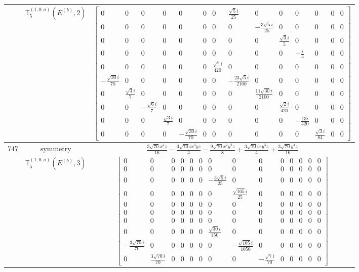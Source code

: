 \documentclass[fleqn,8pt,landscape]{jsarticle}
\begin{document}
\begin{longtable}{ccc}
$  $ & $ \mathbb{T}_{5}^{(1,0;a)}(E^{(b)},2) $ & $ \begin{bmatrix} 0 & 0 & 0 & 0 & 0 & 0 & 0 & \frac{\sqrt{5} i}{25} & 0 & 0 & 0 & 0 & 0 & 0 \\ 0 & 0 & 0 & 0 & 0 & 0 & 0 & 0 & - \frac{3 \sqrt{5} i}{25} & 0 & 0 & 0 & 0 & 0 \\ 0 & 0 & 0 & 0 & 0 & 0 & 0 & 0 & 0 & \frac{\sqrt{3} i}{5} & 0 & 0 & 0 & 0 \\ 0 & 0 & 0 & 0 & 0 & 0 & 0 & 0 & 0 & 0 & - \frac{i}{5} & 0 & 0 & 0 \\ 0 & 0 & 0 & 0 & 0 & 0 & \frac{\sqrt{7} i}{420} & 0 & 0 & 0 & 0 & 0 & 0 & 0 \\ - \frac{\sqrt{30} i}{70} & 0 & 0 & 0 & 0 & 0 & 0 & - \frac{23 \sqrt{5} i}{2100} & 0 & 0 & 0 & 0 & 0 & 0 \\ 0 & \frac{\sqrt{3} i}{7} & 0 & 0 & 0 & 0 & 0 & 0 & \frac{11 \sqrt{30} i}{2100} & 0 & 0 & 0 & 0 & 0 \\ 0 & 0 & - \frac{\sqrt{6} i}{7} & 0 & 0 & 0 & 0 & 0 & 0 & \frac{\sqrt{2} i}{420} & 0 & 0 & 0 & 0 \\ 0 & 0 & 0 & \frac{\sqrt{3} i}{7} & 0 & 0 & 0 & 0 & 0 & 0 & - \frac{13 i}{420} & 0 & 0 & 0 \\ 0 & 0 & 0 & 0 & - \frac{\sqrt{30} i}{70} & 0 & 0 & 0 & 0 & 0 & 0 & \frac{\sqrt{3} i}{84} & 0 & 0 \end{bmatrix} $ \\ \hline
$ 747 $ & $ \text{symmetry} $ & $ \frac{3 \sqrt{70} x^{4} z}{16} - \frac{3 \sqrt{70} i x^{3} y z}{4} - \frac{9 \sqrt{70} x^{2} y^{2} z}{8} + \frac{3 \sqrt{70} i x y^{3} z}{4} + \frac{3 \sqrt{70} y^{4} z}{16} $ \\
$  $ & $ \mathbb{T}_{5}^{(1,0;a)}(E^{(b)},3) $ & $ \begin{bmatrix} 0 & 0 & 0 & 0 & 0 & 0 & 0 & 0 & 0 & 0 & 0 & 0 & 0 & 0 \\ 0 & 0 & 0 & 0 & 0 & 0 & 0 & 0 & 0 & 0 & 0 & 0 & 0 & 0 \\ 0 & 0 & 0 & 0 & 0 & 0 & - \frac{3 \sqrt{5} i}{25} & 0 & 0 & 0 & 0 & 0 & 0 & 0 \\ 0 & 0 & 0 & 0 & 0 & 0 & 0 & \frac{\sqrt{105} i}{25} & 0 & 0 & 0 & 0 & 0 & 0 \\ 0 & 0 & 0 & 0 & 0 & 0 & 0 & 0 & 0 & 0 & 0 & 0 & 0 & 0 \\ 0 & 0 & 0 & 0 & 0 & 0 & 0 & 0 & 0 & 0 & 0 & 0 & 0 & 0 \\ 0 & 0 & 0 & 0 & 0 & 0 & 0 & 0 & 0 & 0 & 0 & 0 & 0 & 0 \\ 0 & 0 & 0 & 0 & 0 & 0 & \frac{\sqrt{30} i}{150} & 0 & 0 & 0 & 0 & 0 & 0 & 0 \\ - \frac{3 \sqrt{70} i}{70} & 0 & 0 & 0 & 0 & 0 & 0 & - \frac{\sqrt{105} i}{1050} & 0 & 0 & 0 & 0 & 0 & 0 \\ 0 & \frac{3 \sqrt{70} i}{70} & 0 & 0 & 0 & 0 & 0 & 0 & - \frac{\sqrt{7} i}{70} & 0 & 0 & 0 & 0 & 0 \end{bmatrix} $ \\ \hline

\end{longtable}
\end{document}
